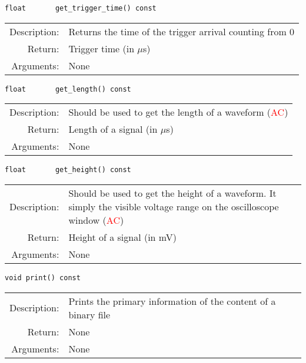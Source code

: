 \begin{lstlisting}
float       get_trigger_time() const
\end{lstlisting}
\begin{tabularx}{\textwidth}{rp{11cm}}
    \toprule
    Description: & Returns the time of the trigger arrival counting from 0\\
    Return: & Trigger time (in $\mu$s)\\
    Arguments: & None\\
    \bottomrule
\end{tabularx}
\vspace{1cm}

\begin{lstlisting}
float       get_length() const
\end{lstlisting}
\begin{tabularx}{\textwidth}{rp{11cm}}
    \toprule
    Description: & Should be used to get the length of a waveform (\textcolor{red}{AC})\\
    Return: & Length of a signal (in $\mu$s)\\
    Arguments: & None\\
    \bottomrule
\end{tabularx}
\vspace{1cm}

\begin{lstlisting}
float       get_height() const
\end{lstlisting}
\begin{tabularx}{\textwidth}{rp{11cm}}
    \toprule
    Description: & Should be used to get the height of a waveform. It simply the visible voltage range on the oscilloscope window (\textcolor{red}{AC})\\
    Return: & Height of a signal (in mV)\\
    Arguments: & None\\
    \bottomrule
\end{tabularx}
\vspace{1cm}

\begin{lstlisting}
void print() const
\end{lstlisting}
\begin{tabularx}{\textwidth}{rp{11cm}}
    \toprule
    Description: & Prints the primary information of the content of a binary file\\
    Return: & None\\
    Arguments: & None\\
    \bottomrule
\end{tabularx}
\vspace{1cm}


